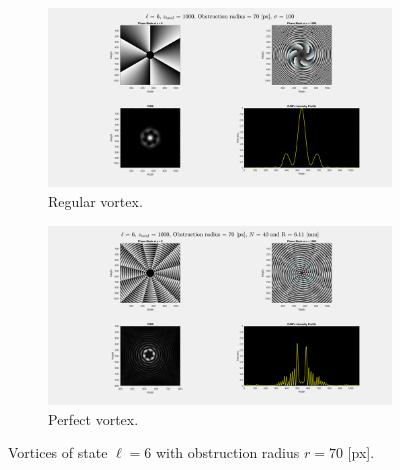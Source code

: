 \begin{figure}[htbp]
    \centering
    \begin{subfigure}[b]{0.45\textwidth}
        \centering
        \includegraphics[width=\textwidth]{images/Appendices/Additional_Results/Topological_Charge/reg_6_r70.png}
        \caption{Regular vortex.}
    \end{subfigure}
    \hfill
    \begin{subfigure}[b]{0.45\textwidth}
        \centering
        \includegraphics[width=\textwidth]{images/Appendices/Additional_Results/Topological_Charge/per_6_r70.png}
        \caption{Perfect vortex.}
    \end{subfigure}
    \caption{Vortices of state $\ell = 6$ with obstruction radius $r=70$ [px].}
    \label{fig:Vortices_L=6_r=70}
\end{figure}

